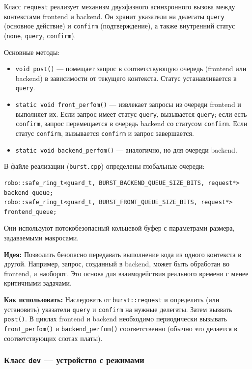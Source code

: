 \documentclass[a4paper,12pt]{article}
\begin{document}
Класс \texttt{request} реализует механизм двухфазного асинхронного вызова между контекстами frontend и backend. Он хранит указатели на делегаты \texttt{query} (основное действие) и \texttt{confirm} (подтверждение), а также внутренний статус (\texttt{none}, \texttt{query}, \texttt{confirm}).

Основные методы:
\begin{itemize}
    \item \texttt{void post()} — помещает запрос в соответствующую очередь (frontend или backend) в зависимости от текущего контекста. Статус устанавливается в \texttt{query}.
    \item \texttt{static void front\_perfom()} — извлекает запросы из очереди frontend и выполняет их. Если запрос имеет статус \texttt{query}, вызывается \texttt{query}; если есть \texttt{confirm}, запрос перемещается в очередь backend со статусом \texttt{confirm}. Если статус \texttt{confirm}, вызывается \texttt{confirm} и запрос завершается.
    \item \texttt{static void backend\_perfom()} — аналогично, но для очереди backend.
\end{itemize}

В файле реализации (\texttt{burst.cpp}) определены глобальные очереди:
\begin{lstlisting}
robo::safe_ring_t<guard_t, BURST_BACKEND_QUEUE_SIZE_BITS, request*> backend_queue;
robo::safe_ring_t<guard_t, BURST_FRONT_QUEUE_SIZE_BITS, request*> frontend_queue;
\end{lstlisting}
Они используют потокобезопасный кольцевой буфер с параметрами размера, задаваемыми макросами.

\textbf{Идея:} Позволить безопасно передавать выполнение кода из одного контекста в другой. Например, запрос, созданный в backend, может быть обработан во frontend, и наоборот. Это основа для взаимодействия реального времени с менее критичными задачами.

\textbf{Как использовать:} Наследовать от \texttt{burst::request} и определить (или установить) указатели \texttt{query} и \texttt{confirm} на нужные делегаты. Затем вызвать \texttt{post()}. В циклах frontend и backend необходимо периодически вызывать \texttt{front\_perfom()} и \texttt{backend\_perfom()} соответственно (обычно это делается в соответствующих слотах платы).

\subsubsection{Класс \texttt{dev} — устройство с режимами}
\end{document}
